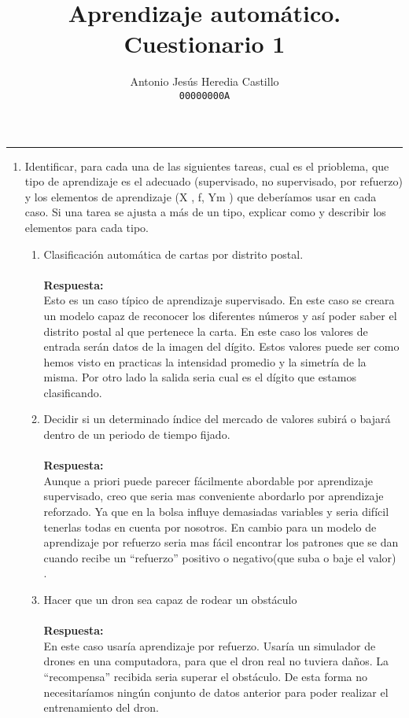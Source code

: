 \documentclass[12pt,a4paper]{article}
\newcommand{\horrule}[1]{\rule{\linewidth}{#1}} %
\begin{document}
\title{Aprendizaje autom\'atico. Cuestionario 1}

\author{
  Antonio Jesús Heredia Castillo\\
  \texttt{00000000A}
}

\date{}
\maketitle
\horrule{2pt}

\begin{enumerate}
	\item Identificar, para cada una de las siguientes tareas, cual es el prioblema, que tipo de	aprendizaje es el adecuado (supervisado, no supervisado, por refuerzo) y los elementos de aprendizaje (X , f, Ym ) que deberíamos usar en cada caso. Si una tarea se ajusta a más de un tipo, explicar como y describir los elementos para cada tipo.
	\begin{enumerate}
		\item  Clasificación automática de cartas por distrito postal.\\\\
		\textbf{Respuesta:}\\
		Esto es un caso típico de aprendizaje supervisado. En este caso se creara un modelo capaz de reconocer los diferentes números y así poder saber el distrito postal al que pertenece la carta. En este caso los valores de entrada serán datos de la imagen del dígito. Estos valores puede ser como hemos visto en practicas la intensidad promedio y la simetría de la misma. Por otro lado la salida seria cual es el dígito que estamos clasificando. 
		 
		\item Decidir si un determinado índice del mercado de valores subirá o bajará dentro de un periodo de tiempo fijado. \\\\
		\textbf{Respuesta:}\\
		Aunque a priori puede parecer fácilmente abordable por aprendizaje supervisado, creo que seria mas conveniente abordarlo por aprendizaje reforzado. Ya que en la bolsa influye demasiadas variables y seria difícil tenerlas todas en cuenta por nosotros. En cambio para un modelo de aprendizaje por refuerzo seria mas fácil encontrar los patrones que se dan cuando recibe un ``refuerzo'' positivo o negativo(que suba o baje el valor) .
		\item Hacer que un dron sea capaz de rodear un obstáculo\\\\		\textbf{Respuesta:}\\
		En este caso usaría aprendizaje por refuerzo. Usaría un simulador de drones en una computadora, para que el dron real no tuviera daños. La ``recompensa'' recibida seria superar el obstáculo. De esta forma no necesitaríamos ningún conjunto de datos anterior para poder realizar el entrenamiento del dron.
		

\end{enumerate}
\end{enumerate}
\end{document}
